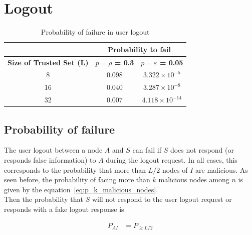 \section{Logout}
  \label{sec:eval_logout}
  \begin{table}
    \centering
    \footnotesize
    \begin{tabular}{|c|c|c|}
      \cline{2-3}
      \multicolumn{1}{c|}{}&  \multicolumn{2}{c|}{\textbf{Probability to fail}} \\ \cline{2-3}
      \hline
      \textbf{Size of Trusted Set (L)} & \textbf{$p = \rho$ = 0.3} &  \textbf{$p = \varepsilon$ = 0.05} \\
      \hline \hline
      8 &  $0.098$ & $3.322 \times 10^{-5}$ \\
      \hline
      16 & $0.040$ & $3.287 \times 10^{-8}$  \\
      \hline
      32 & $0.007$ & $4.118 \times 10^{-14}$  \\
      \hline
    \end{tabular}
    \caption{Probability of failure in user logout}
    \label{tab:p_logout}
  \end{table}
  
  \subsection{Probability of failure}
    The user logout between a node $A$ and $S$ can fail if $S$ does
not respond (or responds false information) to $A$ during the logout request.
  In all cases, this corresponds to the probability that more than
$L/2$ nodes of $I$ are malicious.
    As seen before, the probability of facing more than $k$ malicious nodes among
$n$ is given by the equation~\ref{eq:p_k_malicious_nodes}.\\

    Then the probability that $S$ will not respond to the user logout 
request or responds with a fake logout response is

    \begin{align}
      P_{AI} &= P_{\ge L/2} 
    \end{align}


